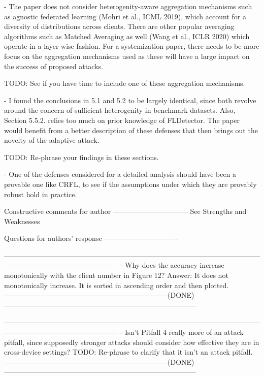 - The paper does not consider heterogenity-aware aggregation mechanisms such as agnostic federated learning (Mohri et al., ICML 2019), which account for a diversity of distributions across clients. There are other popular averaging algorithms such as Matched Averaging as well (Wang et al., ICLR 2020) which operate in a layer-wise fashion. For a systemization paper, there needs to be more focus on the aggregation mechanisms used as these will have a large impact on the success of proposed attacks.

TODO: See if you have time to include one of these aggregation mechanisms.

- I found the conclusions in 5.1 and 5.2 to be largely identical, since both revolve around the concern of sufficient heterogenity in benchmark datasets. Also, Section 5.5.2. relies too much on prior knowledge of FLDetector. The paper would benefit from a better description of these defenses that then brings out the novelty of the adaptive attack.

TODO: Re-phrase your findings in these sections.

- One of the defenses considered for a detailed analysis should have been a provable one like CRFL, to see if the assumptions under which they are provably robust hold in practice.

Constructive comments for author
--------------------------------
See Strengths and Weaknesses

Questions for authors’ response
-------------------------------

------------------------------------------------------------------------------------------------------------------------------------------------------------
- Why does the accuracy increase monotonically with the client number in Figure 12?
Answer: It does not monotonically increase. It is sorted in ascending order and then plotted.
---------------------------------------------------------------------(DONE)---------------------------------------------------------------------------------

------------------------------------------------------------------------------------------------------------------------------------------------------------
- Isn’t Pitfall 4 really more of an attack pitfall, since supposedly stronger attacks should consider how effective they are in cross-device settings?
TODO: Re-phrase to clarify that it isn't an attack pitfall.
---------------------------------------------------------------------(DONE)---------------------------------------------------------------------------------

